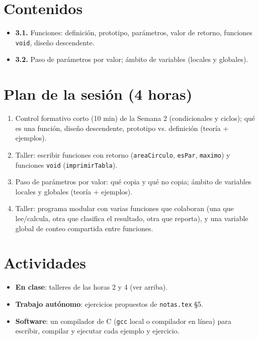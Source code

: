 \documentclass[11pt,letterpaper]{article}
\begin{document}
\section{Contenidos}

\begin{itemize}[leftmargin=1.2cm]
  \item \textbf{3.1.} Funciones: definición, prototipo, parámetros, valor de retorno, funciones
        \texttt{void}, diseño descendente.
  \item \textbf{3.2.} Paso de parámetros por valor; ámbito de variables (locales y globales).
\end{itemize}

\section{Plan de la sesión (4 horas)}

\begin{enumerate}[leftmargin=1.2cm]
  \item[\textbf{Hora 1.}] Control formativo corto (10 min) de la Semana 2 (condicionales y
        ciclos); qué es una función, diseño descendente, prototipo vs. definición (teoría +
        ejemplos).
  \item[\textbf{Hora 2.}] Taller: escribir funciones con retorno (\texttt{areaCirculo},
        \texttt{esPar}, \texttt{maximo}) y funciones \texttt{void} (\texttt{imprimirTabla}).
  \item[\textbf{Hora 3.}] Paso de parámetros por valor: qué copia y qué no copia; ámbito de
        variables locales y globales (teoría + ejemplos).
  \item[\textbf{Hora 4.}] Taller: programa modular con varias funciones que colaboran (una que
        lee/calcula, otra que clasifica el resultado, otra que reporta), y una variable global de
        conteo compartida entre funciones.
\end{enumerate}

\section{Actividades}

\begin{itemize}[leftmargin=1.2cm]
  \item \textbf{En clase}: talleres de las horas 2 y 4 (ver arriba).
  \item \textbf{Trabajo autónomo}: ejercicios propuestos de \texttt{notas.tex} §5.
  \item \textbf{Software}: un compilador de C (\texttt{gcc} local o compilador en línea) para
        escribir, compilar y ejecutar cada ejemplo y ejercicio.
\end{itemize}
\end{document}

